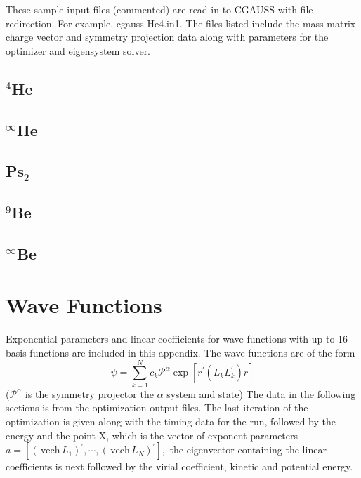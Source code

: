 \documentclass[12pt,thmsa,suthesis,verbatim]{report}
\begin{document}
These sample input files (commented) are read in to CGAUSS with file
redirection. For example, cgauss \TEXTsymbol{<} He4.in1. The files listed
include the mass matrix charge vector and symmetry projection data along
with parameters for the optimizer and eigensystem solver.

\section{$^4$He}

{\normalsize \renewcommand{\baselinestretch}{1} \footnotesize %
 }

\section{$^\infty $He}

{\normalsize \renewcommand{\baselinestretch}{1} \footnotesize %
 }

\section{Ps$_2$}

{\normalsize \renewcommand{\baselinestretch}{1} \footnotesize %
 }

\section{$^9$Be}

{\normalsize \renewcommand{\baselinestretch}{1} \footnotesize %
 }

\section{$^\infty $Be}

{\normalsize \renewcommand{\baselinestretch}{1} \footnotesize %
 }

\chapter{Wave Functions}

Exponential parameters and linear coefficients for wave functions with up to
16 basis functions are included in this appendix. The wave functions are of
the form 
\[
\psi =\sum_{k=1}^Nc_k\mathcal{P}^\alpha \exp \left[ r^{\prime }\left(
L_kL_k^{\prime }\right) r\right] 
\]
($\mathcal{P}^\alpha $ is the symmetry projector the $\alpha $ system and
state) The data in the following sections is from the optimization output
files. The last iteration of the optimization is given along with the timing
data for the run, followed by the energy and the point X, which is the
vector of exponent parameters $a=\left[ \left( \,\mathrm{vech}\,L_1\right)
^{\prime },\cdots ,\left( \,\mathrm{vech}\,L_N\right) ^{\prime }\right] ,$
the eigenvector containing the linear coefficients is next followed by the
virial coefficient, kinetic and potential energy.
\end{document}
